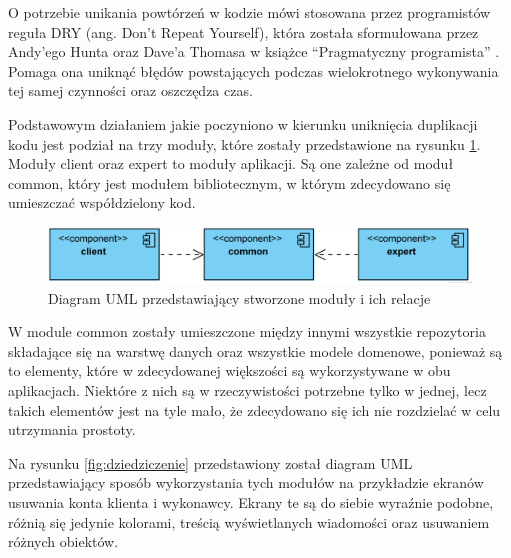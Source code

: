 O potrzebie unikania powtórzeń w kodzie mówi stosowana przez programistów reguła DRY (ang. Don't Repeat Yourself), która została sformułowana przez Andy'ego Hunta oraz Dave'a Thomasa w książce \enquote{Pragmatyczny programista} \cite{pragmatic-programmer}. Pomaga ona uniknąć błędów powstających podczas wielokrotnego wykonywania tej samej czynności oraz oszczędza czas.

Podstawowym działaniem jakie poczyniono w kierunku uniknięcia duplikacji kodu jest podział na trzy moduły, które zostały przedstawione na rysunku \ref{fig:moduły}. Moduły client oraz expert to moduły aplikacji. Są one zależne od moduł common, który jest modułem bibliotecznym, w którym zdecydowano się umieszczać współdzielony kod. 

\begin{figure}[ht!]
  \centering
  \includegraphics[width=\linewidth]{images/modules.png}
  \caption{Diagram UML przedstawiający stworzone moduły i ich relacje}
  \label{fig:moduły}
\end{figure}

W module common zostały umieszczone między innymi wszystkie repozytoria składające się na warstwę danych oraz wszystkie modele domenowe, ponieważ są to elementy, które w zdecydowanej większości są wykorzystywane w obu aplikacjach. Niektóre z nich są w rzeczywistości potrzebne tylko w jednej, lecz takich elementów jest na tyle mało, że zdecydowano się ich nie rozdzielać w celu utrzymania prostoty.

Na rysunku \ref{fig:dziedziczenie} przedstawiony został diagram UML przedstawiający sposób wykorzystania tych modułów na przykładzie ekranów usuwania konta klienta i wykonawcy. Ekrany te są do siebie wyraźnie podobne, różnią się jedynie kolorami, treścią wyświetlanych wiadomości oraz usuwaniem różnych obiektów.

